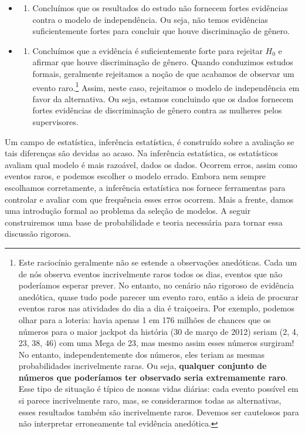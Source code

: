 \documentclass[
]{book}
\providecommand{\tightlist}{%
  \setlength{\itemsep}{0pt}\setlength{\parskip}{0pt}}
\theoremstyle{definition}
\theoremstyle{definition}
\theoremstyle{definition}
\theoremstyle{definition}
\theoremstyle{remark}
\begin{document}
\begin{itemize}
\item
  \begin{enumerate}
  \def\labelenumi{(\arabic{enumi})}
  \tightlist
  \item
    Concluímos que os resultados do estudo não fornecem fortes evidências contra o modelo de independência. Ou seja, não temos evidências suficientemente fortes para concluir que houve discriminação de gênero.
  \end{enumerate}
\item
  \begin{enumerate}
  \def\labelenumi{(\arabic{enumi})}
  \setcounter{enumi}{1}
  \tightlist
  \item
    Concluímos que a evidência é suficientemente forte para rejeitar \(H_0\) e afirmar que houve discriminação de gênero. Quando conduzimos estudos formais, geralmente rejeitamos a noção de que acabamos de observar um evento raro.\footnote{Este raciocínio geralmente não se estende a observações anedóticas. Cada um de nós observa eventos incrivelmente raros todos os dias, eventos que não poderíamos esperar prever. No entanto, no cenário não rigoroso de evidência anedótica, quase tudo pode parecer um evento raro, então a ideia de procurar eventos raros nas atividades do dia a dia é traiçoeira. Por exemplo, podemos olhar para a loteria: havia apenas 1 em 176 milhões de chances que os números para o maior jackpot da história (30 de março de 2012) seriam (2, 4, 23, 38, 46) com uma Mega de 23, mas mesmo assim esses números surgiram! No entanto, independentemente dos números, eles teriam as mesmas probabilidades incrivelmente raras. Ou seja, \textbf{qualquer conjunto de números que poderíamos ter observado seria extremamente raro}. Esse tipo de situação é típico de nossas vidas diárias: cada evento possível em si parece incrivelmente raro, mas, se considerarmos todas as alternativas, esses resultados também são incrivelmente raros. Devemos ser cautelosos para não interpretar erroneamente tal evidência anedótica.} Assim, neste caso, rejeitamos o modelo de independência em favor da alternativa. Ou seja, estamos concluindo que os dados fornecem fortes evidências de discriminação de gênero contra as mulheres pelos supervisores.
  \end{enumerate}
\end{itemize}

Um campo de estatística, inferência estatística, é construído sobre a avaliação se tais diferenças são devidas ao acaso. Na inferência estatística, os estatísticos avaliam qual modelo é mais razoável, dados os dados. Ocorrem erros, assim como eventos raros, e podemos escolher o modelo errado. Embora nem sempre escolhamos corretamente, a inferência estatística nos fornece ferramentas para controlar e avaliar com que frequência esses erros ocorrem. Mais a frente, damos uma introdução formal ao problema da seleção de modelos. A seguir construiremos uma base de probabilidade e teoria necessária para tornar essa discussão rigorosa.
\end{document}
